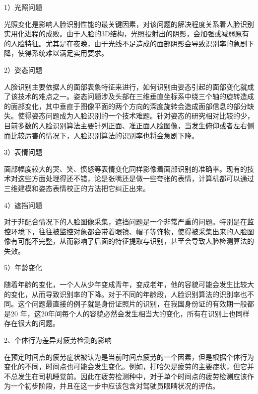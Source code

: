 1）光照问题

光照变化是影响人脸识别性能的最关键因素，对该问题的解决程度关系着人脸识别实用化进程的成败。由于人脸的3D结构，光照投射出的阴影，会加强或减弱原有的人脸特征。尤其是在夜晚，由于光线不足造成的面部阴影会导致识别率的急剧下降，使得系统难以满足实用要求。

2）姿态问题

人脸识别主要依据人的面部表象特征来进行，如何识别由姿态引起的面部变化就成了该技术的难点之一。姿态问题涉及头部在三维垂直坐标系中绕三个轴的旋转造成的面部变化，其中垂直于图像平面的两个方向的深度旋转会造成面部信息的部分缺失。使得姿态问题成为人脸识别的一个技术难题。针对姿态的研究相对比较的少，目前多数的人脸识别算法主要针列正面、准正面人脸图像，当发生俯仰或者左右侧而比较厉害的情况下，人脸识别算法的识别率也将会急剧下降。

3）表情问题

面部幅度较大的哭、笑、愤怒等表情变化同样影像着面部识别的准确率。现有的技术对这些方面处理得还不错，论是张嘴还是做一些夸张的表情，计算机都可以通过三维建模和姿态表情校正的方法把它纠正出来。

4）遮挡问题

对于非配合情况下的人脸图像采集，遮挡问题是一个非常严重的问题。特别是在监控环境下，往往被监控对象都会带着眼镜、帽子等饰物，使得被采集出来的人脸图像有可能不完整，从而影响了后面的特征提取与识别，甚至会导致人脸检测算法的失效。

5）年龄变化

随着年龄的变化，一个人从少年变成青年，变成老年，他的容貌可能会发生比较大的变化，从而导致识别率的下降。对于不同的年龄段，人脸识别算法的识别率也不同。这个问题最直接的例子就是身份证照片的识别，在我国身份证的有效期一般都是20 年，这20年间每个人的容貌必然会发生相当大的变化，所有在识别上也同样存在很大的问题。

2、个体行为差异对疲劳检测的影响

在预定时间点的疲劳症状被认为是当前时间点疲劳的一个因素，但是根据个体行为变化的不同，时间点也可能会发生变化。例如，打哈欠是疲劳的主要症状，但它并不总发生在司机睡觉前。因此在疲劳检测种中，对于单个时间点的疲劳检测应该作为一个初步阶段，并且在这一步中应该包含对驾驶员眼睛状况的评估。

